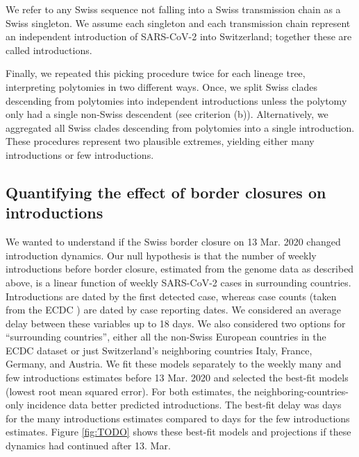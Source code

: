 \documentclass[11pt,twoside,lineno]{pnas-new} %
\begin{document}
We refer to any Swiss sequence not falling into a Swiss transmission chain as a Swiss singleton. We assume each singleton and each transmission chain represent an independent introduction of SARS-CoV-2 into Switzerland; together these are called introductions.

Finally, we repeated this picking procedure twice for each lineage tree, interpreting polytomies in two different ways. Once, we split Swiss clades descending from polytomies into independent introductions unless the polytomy only had a single non-Swiss descendent (see criterion (b)). Alternatively, we aggregated all Swiss clades descending from polytomies into a single introduction. These procedures represent two plausible extremes, yielding either many introductions or few introductions.

\subsection{Quantifying the effect of border closures on introductions}
We wanted to understand if the Swiss border closure on 13 Mar. 2020 changed introduction dynamics. Our null hypothesis is that the number of weekly introductions before border closure, estimated from the genome data as described above, is a linear function of weekly SARS-CoV-2 cases in surrounding countries. Introductions are dated by the first detected case, whereas case counts (taken from the ECDC \cite{ECDC}) are dated by case reporting dates. We considered an average delay between these variables up to 18 days. We also considered two options for ``surrounding countries'', either all the non-Swiss European countries in the ECDC dataset or just Switzerland's neighboring countries Italy, France, Germany, and Austria. We fit these models separately to the weekly many and few introductions estimates before 13 Mar. 2020 and selected the best-fit models (lowest root mean squared error). For both estimates, the neighboring-countries-only incidence data better predicted introductions. The best-fit delay was \casesdelaymax days for the many introductions estimates compared to \casesdelaymin days for the few introductions estimates. Figure \ref{fig:TODO} shows these best-fit models and projections if these dynamics had continued after 13. Mar.
\end{document}
